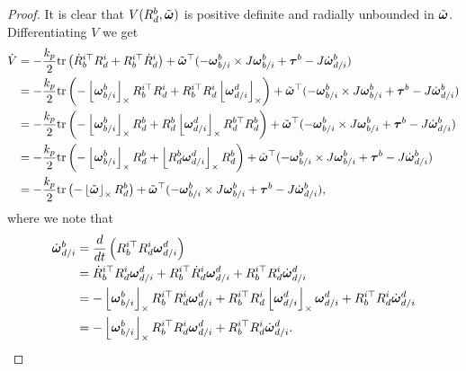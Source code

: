 \begin{proof}
It is clear that $V(R_d^b,\tilde{\omegabf})$ is positive definite and radially unbounded in $\tilde{\omegabf}$.
Differentiating $V$ we get
\begin{align*}
\dot{V} &= -\frac{k_p}{2} \trace{\dot{R}_b^{i\top} R_d^i + R_b^{i\top} \dot{R}_d^i}+ \tilde{\omegabf}^\top ( -\omegabf_{b/i}^b \times J\omegabf_{b/i}^b + \taubf^b - J\dot{\omegabf}_{d/i}^b) \\
        &= -\frac{k_p}{2} \trace{-\ss{\omegabf_{b/i}^b} R_b^{i\top} R_d^i + R_b^{i\top} R_d^i\ss{\omegabf_{d/i}^d} } + \tilde{\omegabf}^\top ( -\omegabf_{b/i}^b \times J\omegabf_{b/i}^b + \taubf^b - J\dot{\omegabf}_{d/i}^b) \\
        &= -\frac{k_p}{2} \trace{-\ss{\omegabf_{b/i}^b} R_d^b + R_d^b \ss{\omegabf_{d/i}^d}R_d^{b\top} R_d^b } + \tilde{\omegabf}^\top ( -\omegabf_{b/i}^b \times J\omegabf_{b/i}^b + \taubf^b - J\dot{\omegabf}_{d/i}^b) \\
        &= -\frac{k_p}{2} \trace{-\ss{\omegabf_{b/i}^b} R_d^b + \ss{R_d^b \omegabf_{d/i}^d} R_d^b } + \tilde{\omegabf}^\top ( -\omegabf_{b/i}^b \times J\omegabf_{b/i}^b + \taubf^b - J\dot{\omegabf}_{d/i}^b) \\
        &= -\frac{k_p}{2} \trace{-\ss{\tilde{\omegabf}} R_d^b } + \tilde{\omegabf}^\top ( -\omegabf_{b/i}^b \times J\omegabf_{b/i}^b + \taubf^b - J\dot{\omegabf}_{d/i}^b),
\end{align*}
where we note that
\begin{align*}
\dot{\omegabf}_{d/i}^b &= \frac{d}{dt}\left(R_b^{i\top}R_d^i\omegabf_{d/i}^d\right) \\
	&=	\dot{R}_b^{i\top}R_d^i\omegabf_{d/i}^d + R_b^{i\top}\dot{R}_d^i\omegabf_{d/i}^d + R_b^{i\top}R_d^i\dot{\omegabf}_{d/i}^d \\
	&=	-\ss{\omegabf_{b/i}^b} R_b^{i\top} R_d^i\omegabf_{d/i}^d + R_b^{i\top}R_d^i\ss{\omegabf_{d/i}^d}\omegabf_{d/i}^d + R_b^{i\top}R_d^i\dot{\omegabf}_{d/i}^d \\
	&=	-\ss{\omegabf_{b/i}^b} R_b^{i\top} R_d^i\omegabf_{d/i}^d  + R_b^{i\top}R_d^i\dot{\omegabf}_{d/i}^d.
\end{align*}


\end{proof}
